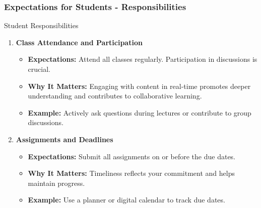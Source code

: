 \documentclass[aspectratio=169]{beamer}
\begin{document}
\begin{frame}[fragile]
    \frametitle{Expectations for Students - Responsibilities}
    \begin{block}{Student Responsibilities}
        \begin{enumerate}
            \item \textbf{Class Attendance and Participation}
            \begin{itemize}
                \item \textbf{Expectations:} Attend all classes regularly. Participation in discussions is crucial.
                \item \textbf{Why It Matters:} Engaging with content in real-time promotes deeper understanding and contributes to collaborative learning.
                \item \textbf{Example:} Actively ask questions during lectures or contribute to group discussions.
            \end{itemize}

            \item \textbf{Assignments and Deadlines}
            \begin{itemize}
                \item \textbf{Expectations:} Submit all assignments on or before the due dates.
                \item \textbf{Why It Matters:} Timeliness reflects your commitment and helps maintain progress.
                \item \textbf{Example:} Use a planner or digital calendar to track due dates.
            \end{itemize}
        \end{enumerate}
    \end{block}
\end{frame}
\end{document}
